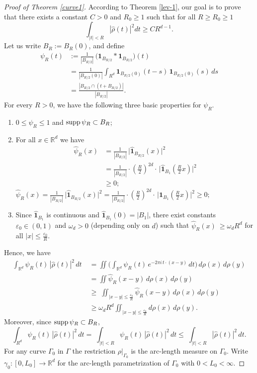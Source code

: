 \documentclass[12pt,a4paper,intlimits,sumlimits]{amsart}
\theoremstyle{plain}
\theoremstyle{definition}
\newcommand{\RR}{{\mathbb R}}
\newcommand{\supp}{{\rm supp\,}}
\newcounter{rem}
\begin{document}
 \begin{proof}[Proof of Theorem \ref{curve1}] According to Theorem \ref{lev-1}, our goal is to prove that there exists a constant $C>0$ and $R_0\ge 1$ such that for all $R\geq R_0\geq1$ $$ \int_{|t|<R}|\widehat{\rho}(t)|^2 d t\geq CR^{d-1}.$$
Let us write $B_R:=B_R(0)$, and define
\begin{align*}
  \psi_R(t) &:=\frac{1}{|B_{R/2}|}\,\big(\mathbf{1}_{B_{R/2}} * \mathbf{1}_{B_{R/2}}\big)(t)\\
   &=\frac{1}{|B_{R/2}(0)|}\int_{R^d} \mathbf{1}_{B_{R/2}(0)}(t-s)\,\mathbf{1}_{B_{R/2}(0)}(s)\,ds\\&=\frac{|B_{R/2}\cap (t+B_{R/2})|}{|B_{R/2}|}.
\end{align*}
For every $R>0$, we have the following three basic properties for $\psi_R$. 
\begin{enumerate}
\item $0\leq\psi_R\leq1$ and $\supp\psi_R \subset B_R$;
\item For all $x\in \mathbb{R}^d$ we have
\ifdefined\SMART
\begin{align*}
\hat{\psi}_R(x) &= \frac{1}{|B_{R/2}|}\,\Big| \hat{\mathbf{1}}_{B_{R/2}}(x)\Big|^2\\
 &= \frac{ 1 }{|B_{R/2}|}\cdot\left(\frac{R}{2 }\right)^{2d}\cdot\,\Big| \hat{\mathbf{1}}_{B_{1}}\left(\frac{R}{2}x\right)\Big|^2\\
&\ge 0;
\end{align*}
\else
$\hat{\psi}_R(x) = \frac{1}{|B_{R/2}|}\,\Big| \hat{\mathbf{1}}_{B_{R/2}}(x)\Big|^2
 = \frac{ 1 }{|B_{R/2}|}\cdot\left(\frac{R}{2 }\right)^{2d}\cdot\,\Big| \hat{\mathbf{1}}_{B_{1}}\left(\frac{R}{2}x\right)\Big|^2
\ge 0;$
\fi
\item Since $\hat{\mathbf{1}}_{B_{1}}$ is continuous and  $\hat{\mathbf{1}}_{B_{1}}(0)=|B_{1}|$, there exist constants $\varepsilon_0\in(0,1)$ and $\omega_d>0$ (depending only on $d$) such that  $\hat{\psi}_R(x) \ \ge \omega_d R^d$ for all $|x|\le \frac{\varepsilon_0}{R}$.
\end{enumerate}
Hence, we have
\begin{align*}%
 \int_{\RR^d} \psi_R(t)\,|\hat{\rho}(t)|^2\,dt\;
  &= \iint \bigg(\int_{\RR^d} \psi_R(t)\, e^{-2\pi i\, t\cdot(x-y)}\,dt\bigg)\, d\rho(x)\,d\rho(y)\\&=\iint\hat{\psi}_R(x-y)\,d\rho(x)\,d\rho(y)
       \\&\ge\; \iint_{|x-y|\le\frac{\varepsilon_0}{R}} \hat{\psi}_R(x-y)\,d\rho(x)\,d\rho(y)
       \\&\ge \omega_d R^d\iint_{|x-y|\le \frac{\varepsilon_0}{R}} d\rho(x)\,d\rho(y).
\end{align*}
Moreover, since $\supp\psi_R \subset B_R$,
$$\int_{R^d} \psi_R(t)\,|\hat{\rho}(t)|^2\,dt=\;\int_{|t|<R} \psi_R(t)\,|\hat{\rho}(t)|^2\,dt\leq\;\int_{|t|<R} |\hat{\rho}(t)|^2\,dt.$$
For any curve $\Gamma_0$ in $\Gamma$ the restriction $\rho|_{\Gamma_0}$ is the arc-length measure on $\Gamma_0$.
 Write $\gamma_0:[0,L_0]\to\mathbb{R}^d$ for the arc-length parametrization of $\Gamma_0$ with $0<L_0<\infty$.  


\end{proof}
\end{document}
